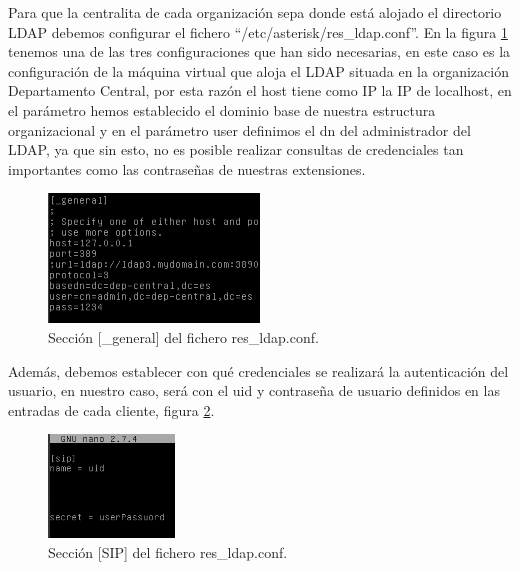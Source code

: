 \documentclass[a4paper]{article}
\begin{document}
Para que la centralita de cada organización sepa donde está alojado el directorio LDAP debemos configurar el fichero ``/etc/asterisk/res\_ldap.conf''. En la figura \ref{fig:res_ldap} tenemos una de las tres configuraciones que han sido necesarias, en este caso es la configuración de la máquina virtual que aloja el LDAP situada en la organización Departamento Central, por esta razón el host tiene como IP la IP de localhost, en el parámetro hemos establecido el dominio base de nuestra estructura organizacional y en el parámetro user definimos el dn del administrador del LDAP, ya que sin esto, no es posible realizar consultas de credenciales tan importantes como las contraseñas de nuestras extensiones. 
\begin{figure}
    \begin{center}
        \includegraphics[width=0.5\textwidth]{ldap/res_ldap.png}
        \caption{Sección [\_general] del fichero res\_ldap.conf.}
         \label{fig:res_ldap}
    \end{center}
\end{figure}

\newpage
Además, debemos establecer con qué credenciales se realizará la autenticación del usuario, en nuestro caso, será con el uid y contraseña de usuario definidos en las entradas de cada cliente, figura \ref{fig:res_ldap2}.

\begin{figure}[htb]
    \begin{center}
        \includegraphics[width=0.3\textwidth]{ldap/res_ldap-2.png}
        \caption{Sección [SIP] del fichero res\_ldap.conf.}
         \label{fig:res_ldap2}
    \end{center}
\end{figure}
\end{document}
